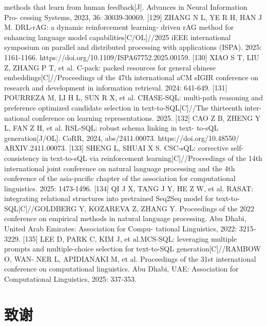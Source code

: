 \documentclass[12pt,a4paper,openright,UTF8]{ctexbook}
\begin{document}
methods that learn from human feedback[J]. Advances in Neural Information Pro-
cessing Systems, 2023, 36: 30039-30069.
[129] ZHANG N L, YE R H, HAN J M. DRL-rAG: a dynamic reinforcement learning-
driven rAG method for enhancing language model capabilities[C/OL]//2025 iEEE
international symposium on parallel and distributed processing with applications
(ISPA). 2025: 1161-1166. https://doi.org/10.1109/ISPA67752.2025.00159.
[130] XIAO S T, LIU Z, ZHANG P T, et al. C-pack: packed resources for general chinese
embeddings[C]//Proceedings of the 47th international aCM sIGIR conference on
research and development in information retrieval. 2024: 641-649.
[131] POURREZA M, LI H L, SUN R X, et al. CHASE-SQL: multi-path reasoning and
preference optimized candidate selection in text-to-SQL[C]//The thirteenth inter-
national conference on learning representations. 2025.
[132] CAO Z B, ZHENG Y L, FAN Z H, et al. RSL-SQL: robust schema linking in text-
to-sQL generation[J/OL]. CoRR, 2024, abs/2411.00073. https://doi.org/10.48550/
ARXIV.2411.00073.
[133] SHENG L, SHUAI X S. CSC-sQL: corrective self-consistency in text-to-sQL via
reinforcement learning[C]//Proceedings of the 14th international joint conference
on natural language processing and the 4th conference of the asia-pacific chapter
of the association for computational linguistics. 2025: 1473-1496.
[134] QI J X, TANG J Y, HE Z W, et al. RASAT: integrating relational structures into
pretrained Seq2Seq model for text-to-SQL[C]//GOLDBERG Y, KOZAREVA Z,
ZHANG Y. Proceedings of the 2022 conference on empirical methods in natural
language processing. Abu Dhabi, United Arab Emirates: Association for Compu-
tational Linguistics, 2022: 3215-3229.
[135] LEE D, PARK C, KIM J, et al.MCS-SQL: leveraging multiple prompts and
multiple-choice selection for text-to-SQL generation[C]//RAMBOW O, WAN-
NER L, APIDIANAKI M, et al. Proceedings of the 31st international conference
on computational linguistics. Abu Dhabi, UAE: Association for Computational
Linguistics, 2025: 337-353.

\chapter*{致\quad 谢}
\end{document}
